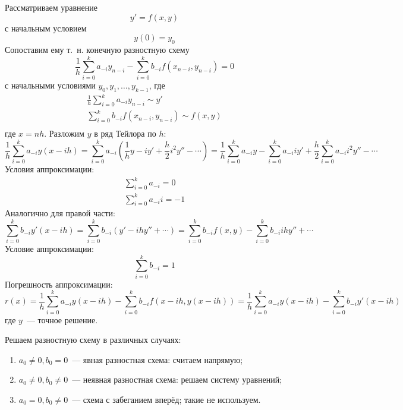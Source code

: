 
Рассматриваем уравнение
\[ y' = f(x, y) \]
с начальным условием
\[ y(0) = y_0\]
Сопоставим ему т. н. конечную разностную схему
\[ \frac{1}{h} \sum_{i=0}^{k} a_{-i} y_{n-i} - \sum_{i=0}^{k} b_{-i} f(x_{n-i}, y_{n-i}) = 0 \]
с начальными условиями $y_0, y_1, \dotsc, y_{k-1}$, где
\begin{gather*}
\frac{1}{h} \sum_{i=0}^{k} a_{-i} y_{n-i} \sim y' \\
\sum_{i=0}^{k} b_{-i} f(x_{n-i}, y_{n-i}) \sim f(x, y) \\
\end{gather*}
где $x = nh$. Разложим $y$ в ряд Тейлора по $h$:
\[ \frac{1}{h} \sum_{i=0}^{k} a_{-i} y(x - i h)
 = \sum_{i=0}^{k} a_{-i} \left( \frac{1}{h} y - i y' + \frac{h}{2} i^2 y'' - \dotsb \right)
 = \frac{1}{h} \sum_{i=0}^{k} a_{-i} y - \sum_{i=0}^{k} a_{-i} i y' + \frac{h}{2} \sum_{i=0}^{k} a_{-i} i^2 y'' - \dotsb
\]
Условия аппроксимации:
\begin{gather*}
\sum_{i=0}^{k} a_{-i} = 0 \\
\sum_{i=0}^{k} a_{-i} i=-1
\end{gather*}
Аналогично для правой части:
\[ \sum_{i=0}^{k} b_{-i} y'(x - i h)
 = \sum_{i=0}^{k} b_{-i} \left( y' - i h y'' + \dotsb \right)
 = \sum_{i=0}^{k} b_{-i} f(x, y) - \sum_{i=0}^{k} b_{-i} i h y'' + \dotsb
\]
Условие аппроксимации:
\[ \sum_{i=0}^{k} b_{-i} = 1 \]
Погрешность аппроксимации:
\[ r(x)
 = \frac{1}{h} \sum_{i=0}^{k} a_{-i} y(x - ih) - \sum_{i=0}^{k} b_{-i} f(x - ih, y(x - ih))
 = \frac{1}{h} \sum_{i=0}^{k} a_{-i} y(x - ih) - \sum_{i=0}^{k} b_{-i} y'(x - ih)
\]
где $y$ — точное решение.

Решаем разностную схему в различных случаях:
\begin{enumerate}
	\item $a_0 ≠ 0, b_0 = 0$ — явная разностная схема: считаем напрямую;
	\item $a_0 ≠ 0, b_0 ≠ 0$ — неявная разностная схема: решаем систему уравнений;
	\item $a_0 = 0, b_0 ≠ 0$ — схема с забеганием вперёд; такие не используем.
\end{enumerate}

